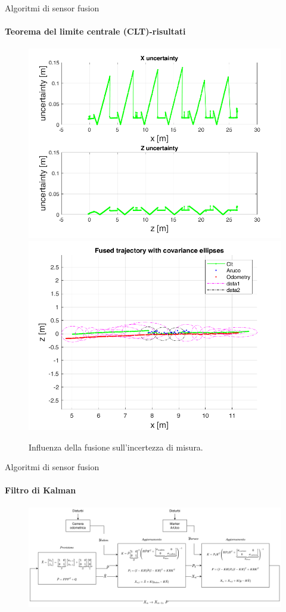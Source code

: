 \documentclass{beamer}
\begin{document}
\begin{frame}{Algoritmi di sensor fusion}
\framesubtitle{Teorema del limite centrale (CLT)-risultati}
    \begin{figure}
        \centering
        \includegraphics[width=.4\textwidth]{images/fusedunc.png}
        \includegraphics[width=.4\textwidth]{images/covelipses.png}
        \caption{Influenza della fusione sull'incertezza di misura.}
    \end{figure}
\end{frame}

\begin{frame}{Algoritmi di sensor fusion}
\framesubtitle{Filtro di Kalman}
    \begin{figure}
        \centering
        \includegraphics[width =\textwidth]{images/kfdiagram.png}
    \end{figure}
\end{frame}
\end{document}
